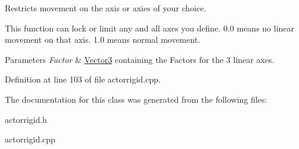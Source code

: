 Restricts movement on the axis or axies of your choice. 

This function can lock or limit any and all axes you define. 0.0 means no linear movement on that axis. 1.0 means normal movement. 
\begin{DoxyParams}{Parameters}
{\em Factor} & \hyperlink{classMezzanine_1_1Vector3}{Vector3} containing the Factors for the 3 linear axes. \\
\hline
\end{DoxyParams}


Definition at line 103 of file actorrigid.cpp.



The documentation for this class was generated from the following files:\begin{DoxyCompactItemize}
\item 
actorrigid.h\item 
actorrigid.cpp\end{DoxyCompactItemize}
